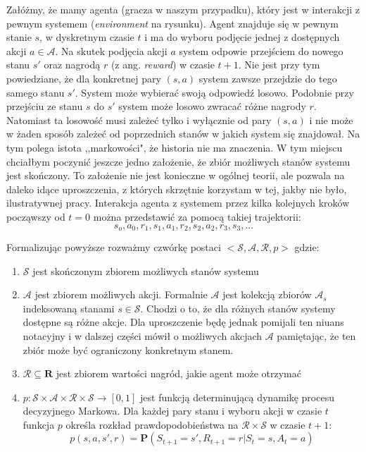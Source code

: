 \documentclass[licencjacka]{pracamgr}
\begin{document}
Załóżmy, że mamy agenta (gracza w naszym przypadku), który jest w interakcji z pewnym systemem (\textit{environment} na rysunku). Agent znajduje się w pewnym stanie $s$, w dyskretnym czasie $t$ i ma do wyboru podjęcie jednej z dostępnych akcji $a\in\mathcal{A}$. Na skutek podjęcia akcji $a$ system odpowie przejściem do nowego stanu $s'$ oraz nagrodą $r$ (z ang. \textit{reward}) w czasie $t+1$.  Nie jest przy tym powiedziane, że dla konkretnej pary $(s,a)$ system zawsze przejdzie do tego samego stanu $s'$. System może wybierać swoją odpowiedź losowo. Podobnie przy przejściu ze stanu $s$ do $s'$ system może losowo zwracać różne nagrody $r$.  Natomiast ta losowość musi zależeć tylko i wyłącznie od pary $(s,a)$ i nie może w żaden sposób zależeć od poprzednich stanów w jakich system się znajdował. Na tym polega istota ,,markowości", że historia nie ma znaczenia. W tym miejscu chciałbym poczynić jeszcze jedno założenie, że zbiór możliwych stanów systemu jest skończony. To założenie nie jest konieczne w ogólnej teorii, ale pozwala na daleko idące uproszczenia, z których skrzętnie korzystam w tej, jakby nie było, ilustratywnej pracy. Interakcja agenta z systemem przez kilka kolejnych kroków począwszy od $t=0$ można przedstawić za pomocą takiej trajektorii:
$$s_{o}, a_{0}, r_{1}, s_{1}, a_{1}, r_{2}, s_{2}, a_{2}, r_{3}, s_{3},...$$

Formalizując powyższe rozważmy czwórkę postaci $<\mathcal{S},\mathcal{A},\mathcal{R},p>$ gdzie:
\begin{enumerate}
 	\item{$\mathcal{S}$ jest skończonym zbiorem możliwych stanów systemu}
	\item{$\mathcal{A}$ jest zbiorem możliwych akcji. Formalnie $\mathcal{A}$ jest kolekcją zbiorów $\mathcal{A}_{s}$ indeksowaną stanami $s\in\mathcal{S}$. Chodzi o to, że dla różnych stanów systemy dostępne są różne akcje.  Dla uproszczenie będę jednak pomijali ten niuans notacyjny i w dalszej części mówił o możliwych akcjach $\mathcal{A}$  pamiętając, że ten zbiór może być ograniczony konkretnym stanem.}
	\item{$\mathcal{R}\subseteq\mathbf{R}$ jest zbiorem wartości nagród, jakie agent może otrzymać}
	\item{$p:\mathcal{S}\times\mathcal{A}\times\mathcal{R}\times\mathcal{S}\rightarrow [0,1]$ jest funkcją determinującą dynamikę procesu decyzyjnego Markowa. Dla każdej pary stanu i wyboru 		akcji w czasie $t$ funkcja $p$ określa rozkład prawdopodobieństwa na $\mathcal{R}\times\mathcal{S}$ w czasie $t+1$:  $$p(s, a, s', r) = \mathbf{P}(S_{t+1}=s', R_{t+1}=r | S_{t}=s, A_{t}=a )$$}
\end{enumerate}
\end{document}
